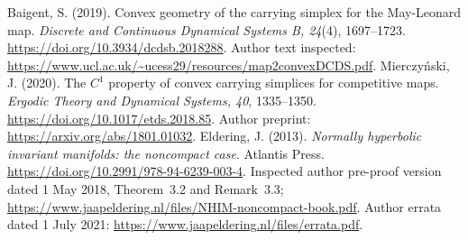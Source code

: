  Baigent, S. (2019). Convex geometry of the carrying simplex for the May-Leonard map. \emph{Discrete and Continuous Dynamical Systems B, 24}(4), 1697--1723. \url{https://doi.org/10.3934/dcdsb.2018288}. Author text inspected: \url{https://www.ucl.ac.uk/~ucess29/resources/map2convexDCDS.pdf}.
 Mierczy\'nski, J. (2020). The $C^1$ property of convex carrying simplices for competitive maps. \emph{Ergodic Theory and Dynamical Systems, 40}, 1335--1350. \url{https://doi.org/10.1017/etds.2018.85}. Author preprint: \url{https://arxiv.org/abs/1801.01032}.
 Eldering, J. (2013). \emph{Normally hyperbolic invariant manifolds: the noncompact case}. Atlantis Press. \url{https://doi.org/10.2991/978-94-6239-003-4}. Inspected author pre-proof version dated 1 May 2018, Theorem~3.2 and Remark~3.3; \url{https://www.jaapeldering.nl/files/NHIM-noncompact-book.pdf}. Author errata dated 1 July 2021: \url{https://www.jaapeldering.nl/files/errata.pdf}.
